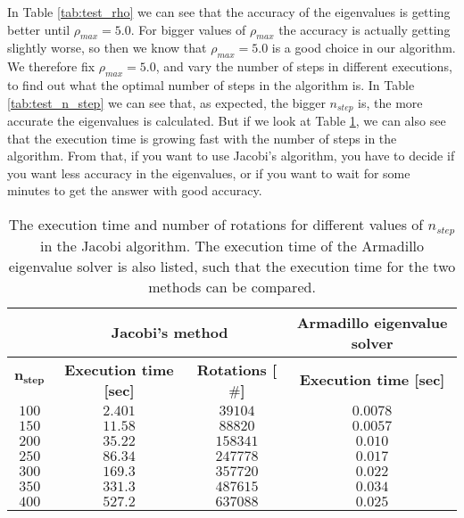 \documentclass[12pt]{article}
\begin{document}
\begin{flushleft}
In Table \ref{tab:test_rho} we can see that the accuracy of the eigenvalues is getting better until $\rho_{max} = 5.0$. For bigger values of $\rho_{max}$ the accuracy is actually getting slightly worse, so then we know that $\rho_{max} = 5.0$ is a good choice in our algorithm. We therefore fix $\rho_{max}=5.0$, and vary the number of steps in different executions, to find out what the optimal number of steps in the algorithm is. In Table \ref{tab:test_n_step} we can see that, as expected, the bigger $n_{step}$ is, the more accurate the eigenvalues is calculated. But if we look at Table \ref{tab:execution_time}, we can also see that the execution time is growing fast with the number of steps in the algorithm. From that, if you want to use Jacobi's algorithm, you have to decide if you want less accuracy in the eigenvalues, or if you want to wait for some minutes to get the answer with good accuracy.
\newpage
\begin{table}[!h]
\begin{center}
\begin{tabular}{| c | c | c | c |}
	\hline
	& \multicolumn{2}{|c|}{\textbf{Jacobi's method}} & \multicolumn{1}{|c|}{\textbf{Armadillo eigenvalue solver}}\\
	\hline
	$\boldsymbol{n_{step}}$ & \textbf{Execution time [sec]} & \textbf{Rotations [$\boldsymbol{\#}$]} &  \textbf{Execution time [sec]}\\
	\hline	
	$100$ & $2.401$ & $39104$ & $0.0078$\\	
	$150$ & $11.58$ & $88820$ & $0.0057$\\	
	$200$ & $35.22$ & $158341$ & $0.010$\\
	$250$ & $86.34$ & $247778$ & $0.017$\\	
    $300$ & $169.3$ & $357720$ & $0.022$\\
    $350$ & $331.3$ & $487615$ & $0.034$\\	
    $400$ & $527.2$ & $637088$ & $0.025$\\
  \hline
\end{tabular}
\end{center}
\caption{\label{tab:execution_time}The execution time and number of rotations for different values of $n_{step}$ in the Jacobi algorithm. The execution time of the Armadillo eigenvalue solver is also listed, such that the execution time for the two methods can be compared.}
\end{table}
\vspace{5mm}
\begin{figure}[h!]
\begin{center}

\end{center}
\end{figure}
\end{flushleft}
\end{document}
